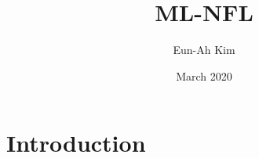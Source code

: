 \documentclass{article}
\title{ML-NFL}
\author{Eun-Ah Kim}
\date{March 2020}
\begin{document}
\maketitle

\section{Introduction}
\end{document}
